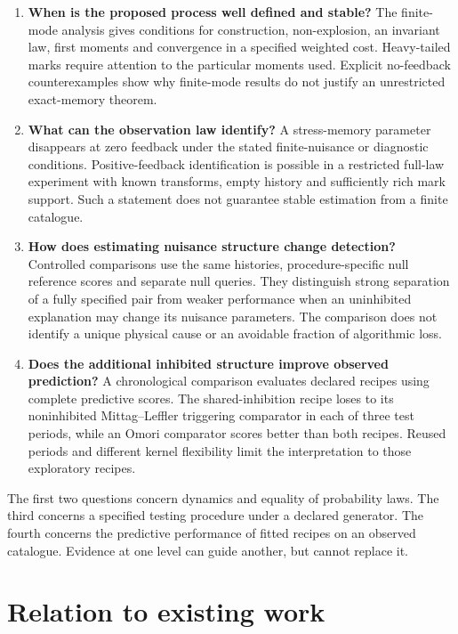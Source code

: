 \begin{enumerate}
 \item \textbf{When is the proposed process well defined and stable?} The finite-mode analysis gives conditions for construction, non-explosion, an invariant law, first moments and convergence in a specified weighted cost. Heavy-tailed marks require attention to the particular moments used. Explicit no-feedback counterexamples show why finite-mode results do not justify an unrestricted exact-memory theorem.
 \item \textbf{What can the observation law identify?} A stress-memory parameter disappears at zero feedback under the stated finite-nuisance or diagnostic conditions. Positive-feedback identification is possible in a restricted full-law experiment with known transforms, empty history and sufficiently rich mark support. Such a statement does not guarantee stable estimation from a finite catalogue.
 \item \textbf{How does estimating nuisance structure change detection?} Controlled comparisons use the same histories, procedure-specific null reference scores and separate null queries. They distinguish strong separation of a fully specified pair from weaker performance when an uninhibited explanation may change its nuisance parameters. The comparison does not identify a unique physical cause or an avoidable fraction of algorithmic loss.
 \item \textbf{Does the additional inhibited structure improve observed prediction?} A chronological comparison evaluates declared recipes using complete predictive scores. The shared-inhibition recipe loses to its noninhibited Mittag--Leffler triggering comparator in each of three test periods, while an Omori comparator scores better than both recipes. Reused periods and different kernel flexibility limit the interpretation to those exploratory recipes.
\end{enumerate}

The first two questions concern dynamics and equality of probability laws. The third concerns a specified testing procedure under a declared generator. The fourth concerns the predictive performance of fitted recipes on an observed catalogue. Evidence at one level can guide another, but cannot replace it.

\section{Relation to existing work}
\label{sec:related_work}

